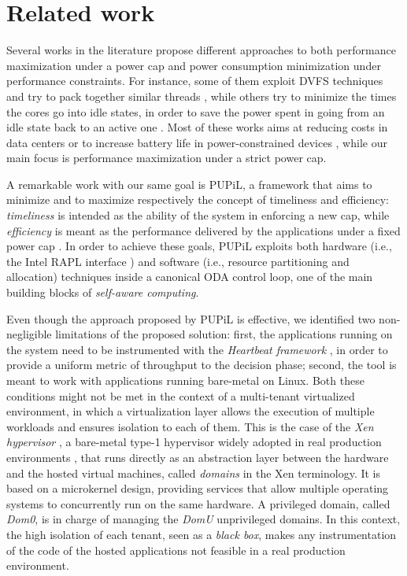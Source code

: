 \section{Related work}
\label{sec:soa}
Several works in the literature propose different approaches to both performance maximization under a power cap and power consumption minimization under performance constraints. For instance, some of them exploit \gls{DVFS} techniques and try to pack together similar threads \cite{chocran2011pack}, while others try to minimize the times the cores go into idle states, in order to save the power spent in going from an idle state back to an active one \cite{kim2015racing}. Most of these works aims at reducing costs in data centers \cite{horvath2007dynamic,meisner2011power,shen2013power} or to increase battery life in power-constrained devices \cite{kim2013formal,mohapatra2005cross,ferroni2013mpower}, while our main focus is performance maximization under a strict power cap. 

A remarkable work with our same goal is PUPiL, a framework that aims to minimize and to maximize respectively the concept of timeliness and efficiency: \emph{timeliness} is intended as the ability of the system in enforcing a new cap, while \emph{efficiency} is meant as the performance delivered by the applications under a fixed power cap \cite{zhang2016maximizing}. In order to achieve these goals, PUPiL exploits both hardware (i.e., the Intel \gls{RAPL} interface \cite{david2010rapl}) and software (i.e., resource partitioning and allocation) techniques inside a canonical \gls{ODA} control loop, one of the main building blocks of \emph{self-aware computing}.

Even though the approach proposed by PUPiL is effective, we identified two non-negligible limitations of the proposed solution: first, the applications running on the system need to be instrumented with the \emph{Heartbeat framework} \cite{hoffman2009application,hoffman2010application}, in order to provide a uniform metric of throughput to the decision phase; second, the tool is meant to work with applications running bare-metal on Linux. Both these conditions might not be met in the context of a multi-tenant virtualized environment, in which a virtualization layer allows the execution of multiple workloads and ensures isolation to each of them. This is the case of the \emph{Xen hypervisor} \cite{barham2002xen}, a bare-metal type-1 hypervisor widely adopted in real production environments \cite{productionExample}, that runs directly as an abstraction layer between the hardware and the hosted virtual machines, called \emph{domains} in the Xen terminology. It is based on a microkernel design, providing services that allow multiple operating systems to concurrently run on the same hardware. A privileged domain, called \emph{Dom0}, is in charge of managing the \emph{DomU} unprivileged domains. In this context, the high isolation of each tenant, seen as a \emph{black box}, makes any instrumentation of the code of the hosted applications not feasible in a real production environment.

